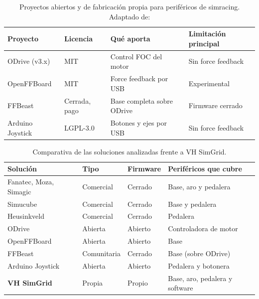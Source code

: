 \begin{table}[htbp]
	\centering
	\caption[Proyectos abiertos y de fabricación propia para periféricos de simracing]{Proyectos abiertos y de fabricación propia para periféricos de simracing. Adaptado de: \parencite{odrive_github, openffboard_github, ffbeast_web, arduino_joystick_library}}
	\label{tab:abiertos}
	\small
	\begin{tabular}{|l|l|l|l|}
		\hline
		\textbf{Proyecto} & \textbf{Licencia} & \textbf{Qué aporta} & \textbf{Limitación principal} \\
		\hline
		ODrive (v3.x)     & MIT             & Control FOC del motor      & Sin force feedback \\
		OpenFFBoard       & MIT             & Force feedback por USB     & Experimental \\
		FFBeast           & Cerrada, pago   & Base completa sobre ODrive & Firmware cerrado \\
		Arduino Joystick  & LGPL-3.0        & Botones y ejes por USB     & Sin force feedback \\
		\hline
	\end{tabular}
\end{table}

\begin{table}[htbp]
	\centering
	\caption{Comparativa de las soluciones analizadas frente a VH SimGrid.}
	\label{tab:comparativa}
	\small
	\begin{tabular}{|l|l|l|l|}
		\hline
		\textbf{Solución} & \textbf{Tipo} & \textbf{Firmware} & \textbf{Periféricos que cubre} \\
		\hline
		Fanatec, Moza, Simagic & Comercial & Cerrado & Base, aro y pedalera \\
		Simucube               & Comercial & Cerrado & Base y pedalera \\
		Heusinkveld            & Comercial & Cerrado & Pedalera \\
		ODrive                 & Abierta   & Abierto & Controladora de motor \\
		OpenFFBoard            & Abierta   & Abierto & Base \\
		FFBeast                & Comunitaria & Cerrado & Base (sobre ODrive) \\
		Arduino Joystick       & Abierta   & Abierto & Pedalera y botonera \\
		\hline
		\textbf{VH SimGrid}    & Propia    & Propio  & Base, aro, pedalera y software \\
		\hline
	\end{tabular}
\end{table}

